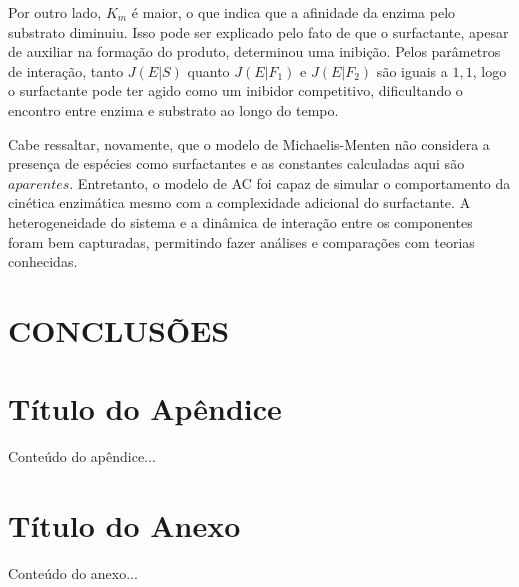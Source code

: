 \documentclass[12pt,oneside]{report}
\begin{document}
Por outro lado, $K_m$ é maior, o que indica que a afinidade da enzima pelo substrato diminuiu. Isso pode ser explicado pelo fato de que o surfactante, apesar de auxiliar na formação do produto, determinou uma inibição. Pelos parâmetros de interação, tanto $J (E|S)$ quanto $J (E|F_1)$ e $J (E|F_2)$ são iguais a $1{,}1$, logo o surfactante pode ter
agido como um inibidor competitivo, dificultando o encontro entre enzima e substrato ao longo do tempo.

Cabe ressaltar, novamente, que o modelo de Michaelis-Menten não considera a presença de espécies como surfactantes e as constantes calculadas aqui são $aparentes$. Entretanto, o modelo de AC foi capaz de simular o comportamento da cinética enzimática mesmo com a complexidade adicional do surfactante. A heterogeneidade do sistema e a dinâmica de interação entre os componentes foram bem capturadas, permitindo fazer análises e comparações com teorias conhecidas.

\chapter{CONCLUSÕES}

\printbibliography[title={REFERÊNCIAS},heading=bibnumbered]

\appendix

\chapter{Título do Apêndice}
Conteúdo do apêndice...

\chapter{Título do Anexo}
Conteúdo do anexo...
\end{document}
